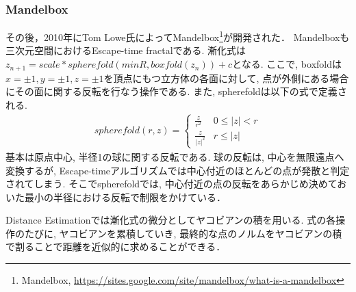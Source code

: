 \subsubsection{Mandelbox}
その後，2010年にTom Lowe氏によってMandelbox\footnote{Mandelbox, \url{https://sites.google.com/site/mandelbox/what-is-a-mandelbox}}が開発された．
Mandelboxも三次元空間におけるEscape-time fractalである. 
漸化式は$z_{n+1} = scale * spherefold(minR, boxfold(z_n)) + c$となる.
ここで, boxfoldは$x=\pm1, y=\pm1, z=\pm1$を頂点にもつ立方体の各面に対して, 点が外側にある場合にその面に関する反転を行なう操作である.
また, spherefoldは以下の式で定義される.
\begin{eqnarray*}
 spherefold(r, z) = \begin{cases}
                  \frac{z}{r^2} & 0 \le |z| < r \\
                  \frac{z}{|z|^2} & r \le |z|
                 \end{cases}
\end{eqnarray*}
基本は原点中心, 半径1の球に関する反転である. 
球の反転は, 中心を無限遠点へ変換するが, Escape-timeアルゴリズムでは中心付近のほとんどの点が発散と判定されてしまう. 
そこでspherefoldでは, 中心付近の点の反転をあらかじめ決めておいた最小の半径における反転で制限をかけている．

Distance Estimationでは漸化式の微分としてヤコビアンの積を用いる. 
式の各操作のたびに, ヤコビアンを累積していき, 
最終的な点のノルムをヤコビアンの積で割ることで距離を近似的に求めることができる．

